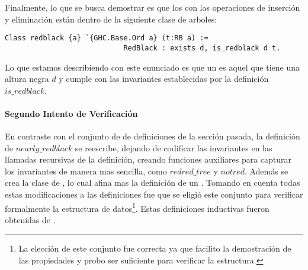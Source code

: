 Finalmente, lo que se busca demostrar es que los {\arns} con las operaciones de inserci\'on y
eliminaci\'on están dentro de la siguiente clase de arboles:

\begin{verbatim}
Class redblack {a} `{GHC.Base.Ord a} (t:RB a) :=
                            RedBlack : exists d, is_redblack d t.
\end{verbatim}

Lo que estamos describiendo con este enunciado es que un {\arn} es aquel que tiene una altura
negra $d$ y cumple con las invariantes establecidas por la definici\'on $is\_redblack$.

\paragraph{Segundo Intento de Verificaci\'on}
En contraste con el conjunto de de definiciones de la secci\'on pasada, la definici\'on de
$nearly\_redblack$ se reescribe, dejando de codificar las invariantes en las llamadas recursivas
de la definición, creando funciones auxiliares para capturar los invariantes de manera mas
sencilla, como $redred\_tree$ y $notred$. Además se crea la clase de {\arns}, lo cual afina mas la
definici\'on de un {\arn}. Tomando en cuenta todas estas modificaciones a las definiciones fue que
se eligió este conjunto para verificar formalmente la estructura de datos\footnote{La elecci\'on
de este conjunto fue correcta ya que facilito la demostraci\'on de las propiedades y probo ser
suficiente para verificar la estructura.}.
Estas definiciones inductivas fueron obtenidas de \cite{MSetRBT}.

